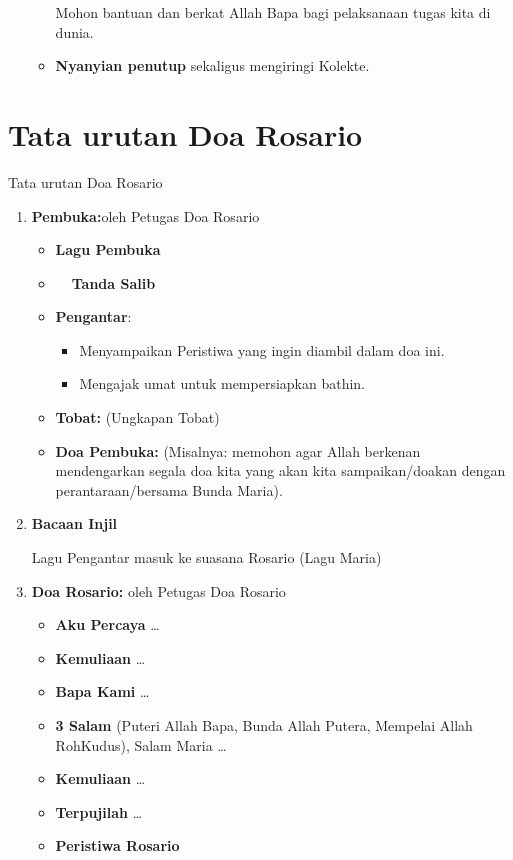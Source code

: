 \begin{enumerate}
\begin{itemize}
Mohon bantuan dan berkat Allah Bapa bagi pelaksanaan tugas kita di
dunia.

\item \textbf{Nyanyian penutup} sekaligus mengiringi Kolekte.

\end{itemize}
\end{enumerate}

\section[Tata urutan Doa Rosario]{Tata urutan Doa Rosario}
Tata urutan Doa Rosario
\begin{enumerate}[label=\Roman*.]

\item  \textbf{Pembuka:}oleh Petugas Doa Rosario
\begin{itemize}
\item \textbf{Lagu Pembuka}
\item  \textbf{\Cross ~~Tanda Salib}
\item \textbf{Pengantar}:
\begin{itemize}
\item Menyampaikan Peristiwa yang ingin diambil dalam doa ini.
\item Mengajak umat untuk mempersiapkan bathin.

\end{itemize}	
\item \textbf{Tobat: }(Ungkapan Tobat)
\item \textbf{Doa Pembuka:} (Misalnya: memohon agar Allah berkenan mendengarkan segala doa kita yang akan kita sampaikan/doakan dengan perantaraan/bersama Bunda Maria).

\end{itemize}

\item  \textbf{Bacaan Injil}

Lagu Pengantar masuk ke suasana Rosario (Lagu Maria)

\item  \textbf{Doa Rosario: }oleh Petugas Doa Rosario
\begin{itemize}
\item \textbf{Aku Percaya} \ldots
\item \textbf{Kemuliaan} \ldots
\item \textbf{Bapa Kami }\ldots
\item \textbf{3 Salam} (Puteri Allah Bapa, Bunda Allah Putera, Mempelai Allah RohKudus), Salam Maria \ldots
\item \textbf{Kemuliaan }\ldots
\item \textbf{Terpujilah} \ldots
\item \textbf{Peristiwa Rosario} 


\end{itemize}
\end{enumerate}
